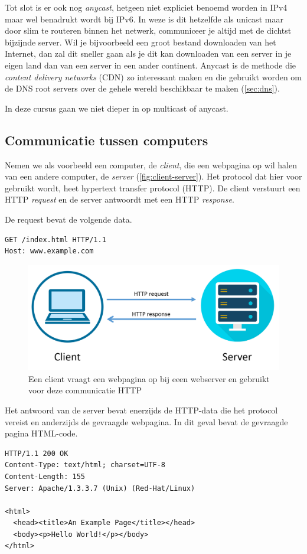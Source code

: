 Tot slot is er ook nog \emph{anycast}, hetgeen niet expliciet benoemd worden in IPv4 maar wel benadrukt wordt bij IPv6.
In weze is dit hetzelfde als unicast maar door slim te routeren binnen het netwerk, communiceer je altijd met de dichtst bijzijnde server.
Wil je bijvoorbeeld een groot bestand downloaden van het Internet, dan zal dit sneller gaan als je dit kan downloaden van een server in je eigen land dan van een server in een ander continent.
Anycast is de methode die \emph{content delivery networks} (CDN) zo interessant maken en die gebruikt worden om de DNS root servers over de gehele wereld beschikbaar te maken (\vref{sec:dns}).

In deze cursus gaan we niet dieper in op multicast of anycast.



\subsection{Communicatie tussen computers}

Nemen we als voorbeeld een computer, de \emph{client}, die een webpagina op wil halen van een andere computer, de \emph{server} (\vref{fig:client-server}).
Het protocol dat hier voor gebruikt wordt, heet hypertext transfer protocol (HTTP).
De client verstuurt een HTTP \emph{request} en de server antwoordt met een HTTP \emph{response}.

De request bevat de volgende data.
\begin{verbatim}
GET /index.html HTTP/1.1
Host: www.example.com
\end{verbatim}

\begin{figure}
   \centering
   \includegraphics[width=.65\textwidth]{images/http-request.png}
   \caption{Een client vraagt een webpagina op bij eeen webserver en gebruikt voor deze communicatie HTTP}
   \label{fig:client-server}
\end{figure}

Het antwoord van de server bevat enerzijds de HTTP-data die het protocol vereist en anderzijds de gevraagde webpagina.
In dit geval bevat de gevraagde pagina HTML-code.
\begin{verbatim}
HTTP/1.1 200 OK
Content-Type: text/html; charset=UTF-8
Content-Length: 155
Server: Apache/1.3.3.7 (Unix) (Red-Hat/Linux)

<html>
  <head><title>An Example Page</title></head>
  <body><p>Hello World!</p></body>
</html>
\end{verbatim}

